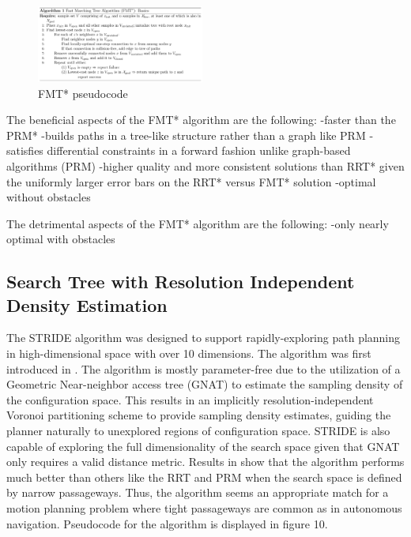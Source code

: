 \documentclass[conference]{IEEEtran} \usepackage[T1]{fontenc} \usepackage[backend=biber, style=ieee]{biblatex}
\begin{document}
\begin{figure}
\label{figure9} 
\centering 
\includegraphics[width=0.49\textwidth]{fmt_star}
\caption{FMT* pseudocode}
\end{figure}

The beneficial aspects of the FMT* algorithm are the following:
-faster than the PRM*
-builds paths in a tree-like structure rather than a graph like PRM
-satisfies differential constraints in a forward fashion unlike graph-based algorithms (PRM)
-higher quality and more consistent solutions than RRT* given the uniformly larger error bars on the RRT* versus FMT* solution
-optimal without obstacles

The detrimental aspects of the FMT* algorithm are the following:
-only nearly optimal with obstacles

\subsection{Search Tree with Resolution Independent Density Estimation} \label{STRIDE}
The STRIDE algorithm was designed to support rapidly-exploring path planning in high-dimensional space with over 10 dimensions. The algorithm was first introduced
in \cite{stride}. The algorithm is mostly parameter-free due to the utilization of a Geometric Near-neighbor access tree (GNAT) to estimate the sampling density of the 
configuration space. This results in an implicitly resolution-independent Voronoi partitioning scheme to provide sampling density estimates, guiding the planner 
naturally to unexplored regions of configuration space. STRIDE is also capable of exploring the full dimensionality of the search space given that GNAT only requires a 
valid distance metric. Results in \cite{stride} show that the algorithm performs much better than others like the RRT and PRM when the search space is defined
by narrow passageways. Thus, the algorithm seems an appropriate match for a motion planning problem where tight passageways are common as in autonomous navigation.
Pseudocode for the algorithm is displayed in figure 10.
\end{document}

